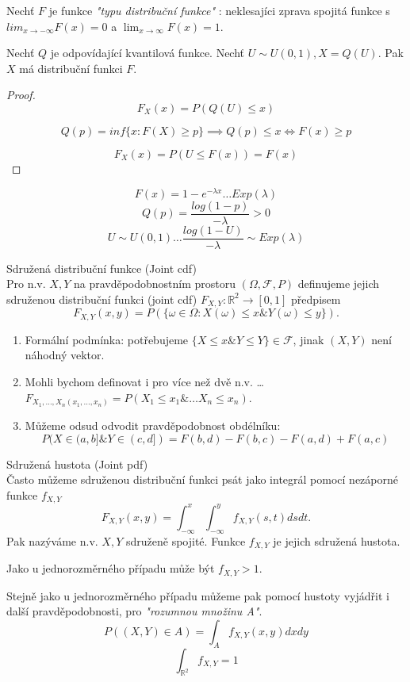 \documentclass[../main.tex]{subfiles}
\begin{document}
\begin{theorem}
    Nechť $F$ je funkce \textit{"typu distribuční funkce"} : neklesajíci zprava spojitá funkce s $lim_{x\rightarrow -\infty} F(x) = 0$ a $\lim_{x \rightarrow \infty} F(x) = 1$.

    Nechť $Q$ je odpovídající kvantilová funkce. Nechť $U \sim U(0,1), X = Q(U)$. Pak $X$ má distribuční funkci $F$.

    \begin{proof}
        \[F_X(x) = P(Q(U) \leq x)\]
        \begin{remark}
            \[Q(p) = inf\{x: F(X) \geq p\} \implies Q(p) \leq x \Leftrightarrow F(x) \geq p\]
        \end{remark}
        \[F_X(x) = P(U \leq F(x)) = F(x)\]
    \end{proof}
\end{theorem}

\begin{example}
    \[F(x) = 1-e^{-\lambda x} \dots Exp(\lambda)\]
    \[Q(p) = \frac{log(1-p)}{-\lambda} > 0\]
    \[U \sim U(0,1) \dots \frac{log(1-U)}{-\lambda} \sim Exp(\lambda)\]
\end{example}

\begin{definition}
    Sdružená distribuční funkce (Joint cdf)\\

    Pro n.v. $X,Y$ na pravděpodobnostním prostoru $(\Omega,\mathcal{F},P)$ definujeme
    jejich sdruženou distribuční funkci (joint cdf) $F_{X,Y} : \mathbb{R}^2 \rightarrow [0,1]$ předpisem
    \[F_{X,Y}(x,y) = P(\{\omega \in \Omega : X(\omega) \leq x \& Y(\omega) \leq y\}).\]
    \begin{enumerate}
        \item Formální podmínka: potřebujeme $\{X\leq x \& Y \leq Y\} \in \mathcal{F}$, jinak $(X,Y)$ není náhodný vektor.
        \item Mohli bychom definovat i pro více než dvě n.v. \dots $F_{X_1,\dots ,X_n(x_1,\dots ,x_n)} = P(X_1 \leq x_1 \& \dots X_n \leq x_n)$.
        \item Můžeme odsud odvodit pravděpodobnost obdélníku:
        \[P(X \in (a,b] \& Y \in (c,d]) = F(b,d) - F(b,c) - F(a,d) + F(a,c)\]
    \end{enumerate}
\end{definition}

\begin{definition}
    Sdružená hustota (Joint pdf)\\

    Často můžeme sdruženou distribuční funkci psát jako integrál pomocí nezáporné funkce $f_{X,Y}$
    \[F_{X,Y}(x,y) = \int^x_{-\infty}\int^y_{-\infty} f_{X,Y}(s,t)dsdt.\]
    Pak nazýváme n.v. $X,Y$ sdruženě spojité. Funkce $f_{X,Y}$ je jejich sdružená hustota.

    Jako u jednorozměrného případu může být $f_{X,Y} > 1$.

    Stejně jako u jednorozměrného případu můžeme pak pomocí hustoty vyjádřit i další pravděpodobnosti,
    pro \textit{"rozumnou množinu A"}.
    \[P((X,Y)\in A) = \int_A f_{X,Y}(x,y)dxdy\]
    \[\int_{\mathbb{R}^2} f_{X,Y} = 1\]
\end{definition}
\end{document}
